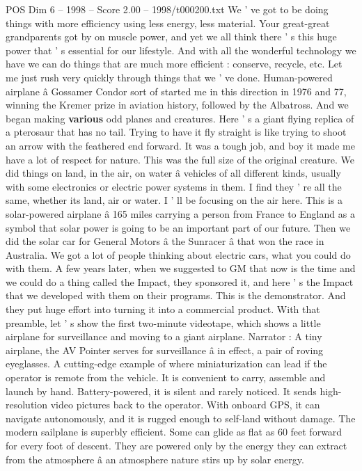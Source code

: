 \begin{textsample}{POS Dim 6 – 1998 – Score 2.00 – 1998/t000200.txt}
We ' ve got to be doing things with more efficiency using less energy, less material.
Your great-great grandparents got by on muscle power, and yet we all think there ' s this huge power that ' s essential for our lifestyle.
And with all the wonderful technology we have we can do things that are much more efficient : conserve, recycle, etc.
Let me just rush very quickly through things that we ' ve done.
Human-powered airplane â Gossamer Condor sort of started me in this direction in 1976 and 77, winning the Kremer prize in aviation history, followed by the Albatross.
And we began making \textbf{various} odd planes and creatures.
Here ' s a giant flying replica of a pterosaur that has no tail.
Trying to have it fly straight is like trying to shoot an arrow with the feathered end forward.
It was a tough job, and boy it made me have a lot of respect for nature.
This was the full size of the original creature.
We did things on land, in the air, on water â vehicles of all different kinds, usually with some electronics or electric power systems in them.
I find they ' re all the same, whether its land, air or water.
I ' ll be focusing on the air here.
This is a solar-powered airplane â 165 miles carrying a person from France to England as a symbol that solar power is going to be an important part of our future.
Then we did the solar car for General Motors â the Sunracer â that won the race in Australia.
We got a lot of people thinking about electric cars, what you could do with them.
A few years later, when we suggested to GM that now is the time and we could do a thing called the Impact, they sponsored it, and here ' s the Impact that we developed with them on their programs.
This is the demonstrator.
And they put huge effort into turning it into a commercial product.
With that preamble, let ' s show the first two-minute videotape, which shows a little airplane for surveillance and moving to a giant airplane.
Narrator : A tiny airplane, the AV Pointer serves for surveillance â in effect, a pair of roving eyeglasses.
A cutting-edge example of where miniaturization can lead if the operator is remote from the vehicle.
It is convenient to carry, assemble and launch by hand.
Battery-powered, it is silent and rarely noticed.
It sends high-resolution video pictures back to the operator.
With onboard GPS, it can navigate autonomously, and it is rugged enough to self-land without damage.
The modern sailplane is superbly efficient.
Some can glide as flat as 60 feet forward for every foot of descent.
They are powered only by the energy they can extract from the atmosphere â an atmosphere nature stirs up by solar energy.

\end{textsample}
